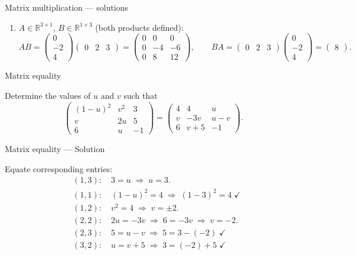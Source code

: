 \documentclass[9pt]{beamer}
\begin{document}
\begin{frame}{Matrix multiplication — solutions}
\begin{enumerate}[leftmargin=0.5cm, label=(\alph*), rightmargin=0.2cm]
\item $A\in\mathbb{R}^{3\times 1}$, $B\in\mathbb{R}^{1\times 3}$ (both products defined):
\[
AB=
\begin{pmatrix}
0\\[2pt]-2\\[2pt]4
\end{pmatrix}
\!\!
\begin{pmatrix}
0&2&3
\end{pmatrix}
=
\begin{pmatrix}
0&0&0\\[2pt]
0&-4&-6\\[2pt]
0&8&12
\end{pmatrix},\qquad
BA=
\begin{pmatrix}
0&2&3
\end{pmatrix}
\!\!
\begin{pmatrix}
0\\[2pt]-2\\[2pt]4
\end{pmatrix}
=
\begin{pmatrix}
8
\end{pmatrix}.
\]

\end{enumerate}
\end{frame}

\begin{frame}{Matrix equality}

Determine the values of $u$ and $v$ such that 
        $$
        \begin{pmatrix}
            (1 - u)^2 & v^2 & 3 \\
            v & 2u & 5 \\
            6 & u & -1
        \end{pmatrix} = 
        \begin{pmatrix}
        4 & 4 & u \\
        v & -3v & u-v \\
        6 & v + 5 & -1
        \end{pmatrix}.
        $$
    
\end{frame}

\begin{frame}{Matrix equality — Solution}

Equate corresponding entries:
\[
\begin{aligned}
&(1,3):\quad 3=u \;\Rightarrow\; u=3.\\
&(1,1):\quad (1-u)^2=4 \;\Rightarrow\; (1-3)^2=4 \;\checkmark\\
&(1,2):\quad v^2=4 \;\Rightarrow\; v=\pm2.\\
&(2,2):\quad 2u=-3v \;\Rightarrow\; 6=-3v \;\Rightarrow\; v=-2.\\
&(2,3):\quad 5=u-v \;\Rightarrow\; 5=3-(-2) \;\checkmark\\
&(3,2):\quad u=v+5 \;\Rightarrow\; 3=(-2)+5 \;\checkmark
\end{aligned}
\]

\end{frame}
\end{document}
